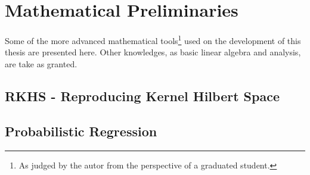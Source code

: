 \chapter{Mathematical Preliminaries}

Some of the more advanced mathematical tools\footnote{As judged by the autor
from the perspective of a graduated student.} used on the development of this
thesis are presented here.
Other knowledges, as basic linear algebra and analysis, are take as granted.


\section{RKHS - Reproducing Kernel Hilbert Space}
\section{Probabilistic Regression}